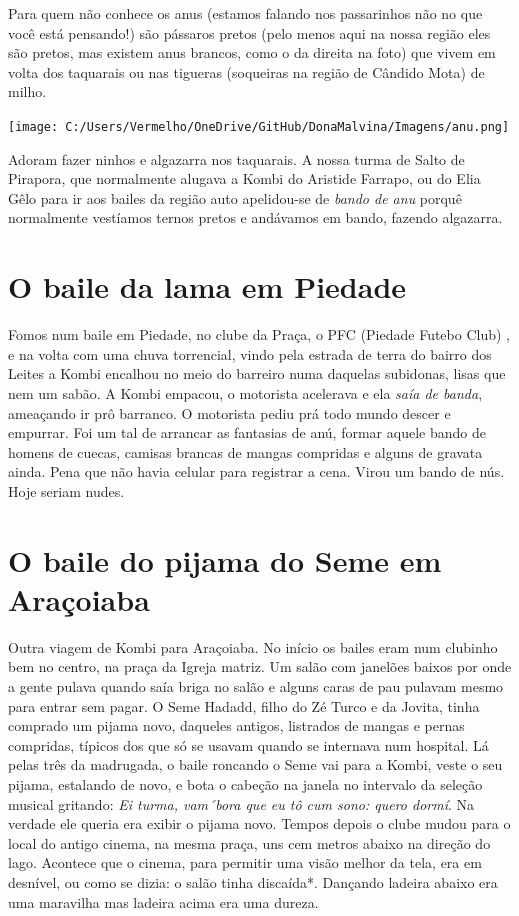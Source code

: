 \documentclass[12pt,brazil,]{book}
\begin{document}
Para quem não conhece os anus (estamos falando nos passarinhos não no
que você está pensando!) são pássaros pretos (pelo menos aqui na nossa
região eles são pretos, mas existem anus brancos, como o da direita na
foto) que vivem em volta dos taquarais ou nas tigueras (soqueiras na
região de Cândido Mota) de milho.

\texttt{[image: C:/Users/Vermelho/OneDrive/GitHub/DonaMalvina/Imagens/anu.png]}

Adoram fazer ninhos e algazarra nos taquarais. A nossa turma de Salto de
Pirapora, que normalmente alugava a Kombi do Aristide Farrapo, ou do
Elia Gêlo para ir aos bailes da região auto apelidou-se de \emph{bando
de anu} porquê normalmente vestíamos ternos pretos e andávamos em bando,
fazendo algazarra.

\section{O baile da lama em Piedade}\label{o-baile-da-lama-em-piedade}

Fomos num baile em Piedade, no clube da Praça, o PFC (Piedade Futebo
Club) , e na volta com uma chuva torrencial, vindo pela estrada de terra
do bairro dos Leites a Kombi encalhou no meio do barreiro numa daquelas
subidonas, lisas que nem um sabão. A Kombi empacou, o motorista
acelerava e ela \emph{saía de banda}, ameaçando ir prô barranco. O
motorista pediu prá todo mundo descer e empurrar. Foi um tal de arrancar
as fantasias de anú, formar aquele bando de homens de cuecas, camisas
brancas de mangas compridas e alguns de gravata ainda. Pena que não
havia celular para registrar a cena. Virou um bando de nús. Hoje seriam
nudes.

\section{O baile do pijama do Seme em
Araçoiaba}\label{o-baile-do-pijama-do-seme-em-arauxe7oiaba}

Outra viagem de Kombi para Araçoiaba. No início os bailes eram num
clubinho bem no centro, na praça da Igreja matriz. Um salão com janelões
baixos por onde a gente pulava quando saía briga no salão e alguns caras
de pau pulavam mesmo para entrar sem pagar. O Seme Hadadd, filho do Zé
Turco e da Jovita, tinha comprado um pijama novo, daqueles antigos,
listrados de mangas e pernas compridas, típicos dos que só se usavam
quando se internava num hospital. Lá pelas três da madrugada, o baile
roncando o Seme vai para a Kombi, veste o seu pijama, estalando de novo,
e bota o cabeção na janela no intervalo da seleção musical gritando:
\emph{Ei turma, vam´bora que eu tô cum sono: quero dormí}. Na verdade
ele queria era exibir o pijama novo. Tempos depois o clube mudou para o
local do antigo cinema, na mesma praça, uns cem metros abaixo na direção
do lago. Acontece que o cinema, para permitir uma visão melhor da tela,
era em desnível, ou como se dizia: o salão tinha discaída*. Dançando
ladeira abaixo era uma maravilha mas ladeira acima era uma dureza.
\end{document}

